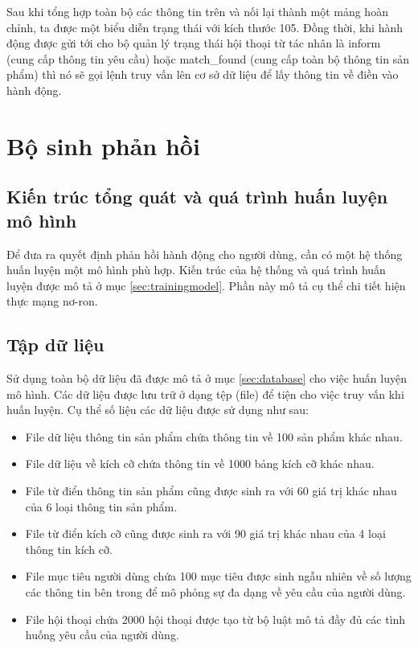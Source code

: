 Sau khi tổng hợp toàn bộ các thông tin trên và nối lại thành một mảng hoàn chỉnh, ta được một biểu diễn trạng thái với kích thước 105. Đồng thời, khi hành động được gửi tới cho bộ quản lý trạng thái hội thoại từ tác nhân là inform (cung cấp thông tin yêu cầu) hoặc match\_found (cung cấp toàn bộ thông tin sản phẩm) thì nó sẽ gọi lệnh truy vấn lên cơ sở dữ liệu để lấy thông tin về điền vào hành động.

\section{Bộ sinh phản hồi}
\label{sec:agentresponse}
\subsection{Kiến trúc tổng quát và quá trình huấn luyện mô hình}
Để đưa ra quyết định phản hồi hành động cho người dùng, cần có một hệ thống huấn luyện một mô hình phù hợp. Kiến trúc của hệ thống và quá trình huấn luyện được mô tả ở mục \ref{sec:trainingmodel}. Phần này mô tả cụ thể chi tiết hiện thực mạng nơ-ron.

\subsection{Tập dữ liệu}
Sử dụng toàn bộ dữ liệu đã được mô tả ở mục \ref{sec:database} cho việc huấn luyện mô hình. Các dữ liệu được lưu trữ ở dạng tệp (file) để tiện cho việc truy vấn khi huấn luyện. Cụ thể số liệu các dữ liệu được sử dụng như sau:

\begin{itemize}
    \item File dữ liệu thông tin sản phẩm chứa thông tin về 100 sản phẩm khác nhau.
    \item File dữ liệu về kích cỡ chứa thông tin về 1000 bảng kích cỡ khác nhau.
    \item File từ điển thông tin sản phẩm cũng được sinh ra với 60 giá trị khác nhau của 6 loại thông tin sản phẩm.
    \item File từ điển kích cỡ cũng được sinh ra với 90 giá trị khác nhau của 4 loại thông tin kích cỡ.
    \item File mục tiêu người dùng chứa 100 mục tiêu được sinh ngẫu nhiên về số lượng các thông tin bên trong để mô phỏng sự đa dạng về yêu cầu của người dùng.
    \item File hội thoại chứa 2000 hội thoại được tạo từ bộ luật mô tả đầy đủ các tình huống yêu cầu của người dùng.
\end{itemize}

